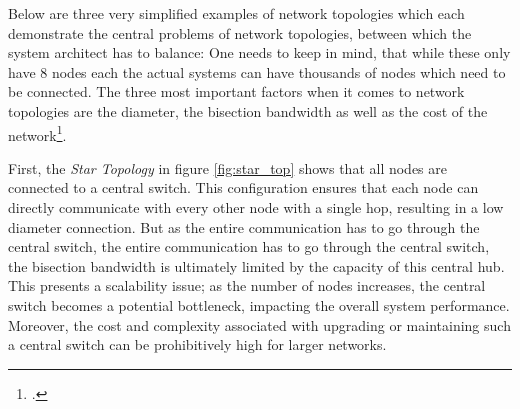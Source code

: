 Below are three very simplified examples of network topologies which each demonstrate the central problems of network topologies, between which the system architect has to balance:
One needs to keep in mind, that while these only have 8 nodes each the actual systems can have thousands of nodes which need to be connected.
The three most important factors when it comes to network topologies are the diameter, the bisection bandwidth as well as the cost of the network\footcite{bestaHighPerformanceRoutingMultipathing2021b}.

First, the \textit{Star Topology} in figure \ref{fig:star_top} shows that all nodes are connected to a central switch.
This configuration ensures that each node can directly communicate with every other node with a single hop, resulting in a low diameter connection.
But as the entire communication has to go through the central switch, the entire communication has to go through the central switch, the bisection bandwidth is ultimately limited by the capacity of this central hub.
This presents a scalability issue; as the number of nodes increases, the central switch becomes a potential bottleneck, impacting the overall system performance. Moreover, the cost and complexity associated with upgrading or maintaining such a central switch can be prohibitively high for larger networks.

